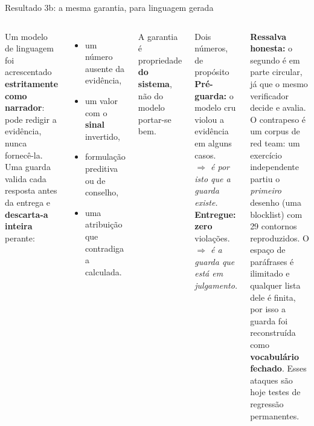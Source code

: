 \documentclass[aspectratio=169]{beamer}
\begin{document}
\begin{frame}{Resultado 3b: a mesma garantia, para linguagem gerada}
\begin{columns}
\small
Um modelo de linguagem foi acrescentado \textbf{estritamente como narrador}: pode redigir a
evidência, nunca fornecê-la. Uma guarda valida cada resposta antes da entrega e
\textbf{descarta-a inteira} perante:
\begin{itemize}\small
  \item um número ausente da evidência,
  \item um valor com o \textbf{sinal} invertido,
  \item formulação preditiva ou de conselho,
  \item uma atribuição que contradiga a calculada.
\end{itemize}
A garantia é propriedade \textbf{do sistema}, não do modelo portar-se bem.
\begin{block}{Dois números, de propósito}
\small
\textbf{Pré-guarda:} o modelo cru violou a evidência em alguns casos.\\
\emph{$\Rightarrow$ é por isto que a guarda existe.}\\[4pt]
\textbf{Entregue:} \textbf{zero} violações.\\
\emph{$\Rightarrow$ é a guarda que está em julgamento.}
\end{block}
{\footnotesize\textbf{Ressalva honesta:} o segundo é em parte circular, já que o mesmo
verificador decide e avalia. O contrapeso é um corpus de red team: um exercício independente
partiu o \emph{primeiro} desenho (uma blocklist) com 29 contornos reproduzidos. O espaço de
paráfrases é ilimitado e qualquer lista dele é finita, por isso a guarda foi reconstruída como
\textbf{vocabulário fechado}. Esses ataques são hoje testes de regressão permanentes.}
\end{columns}
\end{frame}
\end{document}
